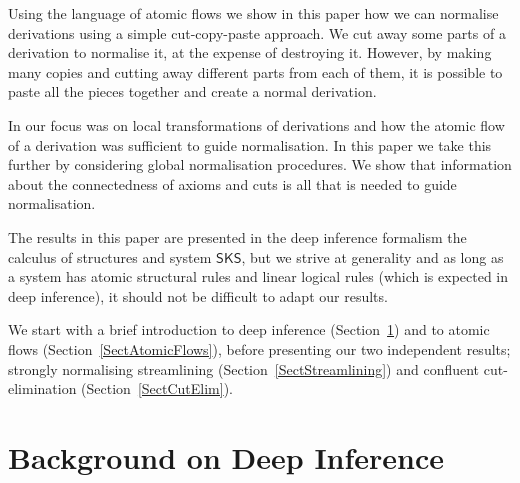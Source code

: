 \documentclass[a4paper]{amsart}
\theoremstyle{remark}
\theoremstyle{definition}
\begin{document}
Using the language of atomic flows we show in this paper how we can normalise derivations using a simple cut-copy-paste approach. We cut away some parts of a derivation to normalise it, at the expense of destroying it. However, by making many copies and cutting away different parts from each of them, it is possible to paste all the pieces together and create a normal derivation.

In \cite{GuglGund:07:Normalis:lr} our focus was on local transformations of derivations and how the atomic flow of a derivation was sufficient to guide normalisation. In this paper we take this further by considering global normalisation procedures. We show that information about the connectedness of axioms and cuts is all that is needed to guide normalisation.


\newcommand{\SKS}{\mathsf{SKS}}
The results in this paper are presented in the deep inference formalism the calculus of structures and system $\SKS$, but we strive at generality and as long as a system has atomic structural rules and linear logical rules (which is expected in deep inference), it should not be difficult to adapt our results.

We start with a brief introduction to deep inference (Section~\ref{SectDeepInference}) and to atomic flows (Section~\ref{SectAtomicFlows}), before presenting our two independent results; strongly normalising streamlining (Section~\ref{SectStreamlining}) and confluent cut-elimination (Section~\ref{SectCutElim}).

\section{Background on Deep Inference}\label{SectDeepInference}
\end{document}

